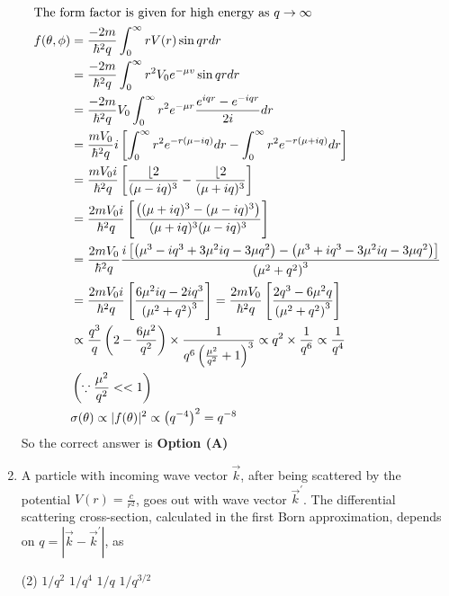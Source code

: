 \begin{enumerate}
\begin{answer}
\begin{align*}
\intertext{The form factor is given for high energy as $q \rightarrow \infty$}
f(\theta, \phi)&=\frac{-2 m}{\hbar^{2} q} \int_{0}^{\infty} r V(r) \sin q r d r\\&=\frac{-2 m}{\hbar^{2} q} \int_{0}^{\infty} r^{2} V_{0} e^{-\mu v} \sin q r d r\\
&=\frac{-2 m}{\hbar^{2} q} V_{0} \int_{0}^{\infty} r^{2} e^{-\mu r} \frac{e^{i q r}-e^{-i q r}}{2 i} d r\\&=\frac{m V_{0}}{\hbar^{2} q} i\left[\int_{0}^{\infty} r^{2} e^{-r(\mu-i q)} d r-\int_{0}^{\infty} r^{2} e^{-r(\mu+i q)} d r\right]\\
&=\frac{m V_{0} i}{\hbar^{2} q}\left[\frac{\lfloor 2}{(\mu-i q)^{3}}-\frac{\lfloor 2}{(\mu+i q)^{3}}\right]\\&=\frac{2 m V_{0} i}{\hbar^{2} q}\left[\frac{\left((\mu+i q)^{3}-(\mu-i q)^{3}\right)}{(\mu+i q)^{3}(\mu-i q)^{3}}\right]\\
&=\frac{2 m V_{0}}{\hbar^{2} q} \frac{i\left[\left(\mu^{3}-i q^{3}+3 \mu^{2} i q-3 \mu q^{2}\right)-\left(\mu^{3}+i q^{3}-3 \mu^{2} i q-3 \mu q^{2}\right)\right]}{\left(\mu^{2}+q^{2}\right)^{3}}\\
&=\frac{2 m V_{0} i}{\hbar^{2} q}\left[\frac{6 \mu^{2} i q-2 i q^{3}}{\left(\mu^{2}+q^{2}\right)^{3}}\right]=\frac{2 m V_{0}}{\hbar^{2} q}\left[\frac{2 q^{3}-6 \mu^{2} q}{\left(\mu^{2}+q^{2}\right)^{3}}\right]\\
&\propto \frac{q^{3}}{q}\left(2-\frac{6 \mu^{2}}{q^{2}}\right) \times \frac{1}{q^{6}\left(\frac{\mu^{2}}{q^{2}}+1\right)^{3}} \propto q^{2} \times \frac{1}{q^{6}} \propto \frac{1}{q^{4}} \\&\left(\because \frac{\mu^{2}}{q^{2}}<<1\right)\\
&\sigma(\theta) \propto|f(\theta)|^{2} \propto\left(q^{-4}\right)^{2}=q^{-8}
\end{align*}
So the correct answer is \textbf{Option (A)}
\end{answer}	
\item A particle with incoming wave vector $\vec{k}$, after being scattered by the potential $V(r)=\frac{c}{r^{2}}$, goes out with wave vector $\vec{k}^{\prime}$. The differential scattering cross-section, calculated in the first Born approximation, depends on $q=\left|\vec{k}-\vec{k}^{\prime}\right|$, as
{}
\begin{tasks}(2)
\task[\textbf{A.}] $1 / q^{2}$
\task[\textbf{B.}] $1 / q^{4}$
\task[\textbf{C.}]  $1 / q$
\task[\textbf{D.}] $1 / q^{3 / 2}$

\end{tasks}
\end{enumerate}
